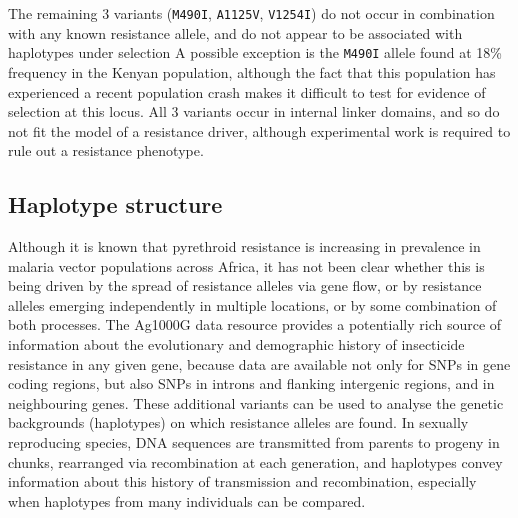 \documentclass[a4paper,11pt,abstracton,hidelinks]{scrartcl}
\begin{document}
%
The remaining 3 variants (\texttt{M490I}, \texttt{A1125V}, \texttt{V1254I}) do not occur in combination with any known resistance allele, and do not appear to be associated with haplotypes under selection \cite{Ag1000gConsortium2017}
%
A possible exception is the \texttt{M490I} allele found at 18\% frequency in the Kenyan population, although the fact that this population has experienced a recent population crash makes it difficult to test for evidence of selection at this locus.
%
All 3 variants occur in internal linker domains, and so do not fit the model of a resistance driver, although experimental work is required to rule out a resistance phenotype.
%


\subsection*{Haplotype structure}


%
Although it is known that pyrethroid resistance is increasing in prevalence in malaria vector populations across Africa, it has not been clear whether this is being driven by the spread of resistance alleles via gene flow, or by resistance alleles emerging independently in multiple locations, or by some combination of both processes.
%
The Ag1000G data resource provides a potentially rich source of information about the evolutionary and demographic history of insecticide resistance in any given gene, because data are available not only for SNPs in gene coding regions, but also SNPs in introns and flanking intergenic regions, and in neighbouring genes.
%
These additional variants can be used to analyse the genetic backgrounds (haplotypes) on which resistance alleles are found.
%
In sexually reproducing species, DNA sequences are transmitted from parents to progeny in chunks, rearranged via recombination at each generation, and haplotypes convey information about this history of transmission and recombination, especially when haplotypes from many individuals can be compared.
%
\end{document}
